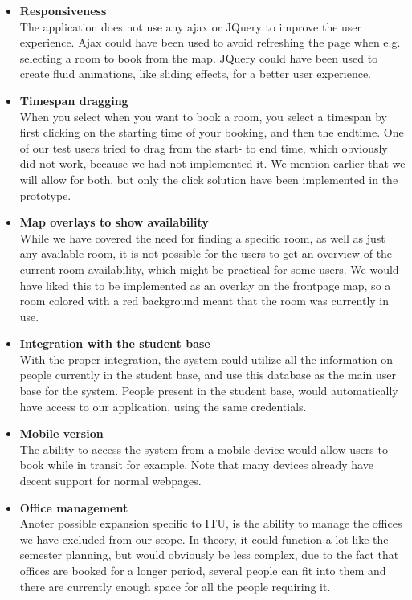 \begin{itemize}
	\item \textbf{Responsiveness}\\
	The application does not use any ajax or JQuery to improve the user experience. Ajax could have been used to avoid refreshing the page when e.g. selecting a room to book from the map. JQuery could have been used to create fluid animations, like sliding effects, for a better user experience. 
	
	\item \textbf{Timespan dragging}\\
	When you select when you want to book a room, you select a timespan by first clicking on the starting time of your booking, and then the endtime. One of our test users tried to drag from the start- to end time, which obviously did not work, because we had not implemented it. We mention earlier that we will allow for both, but only the click solution have been implemented in the prototype.
	
	\item \textbf{Map overlays to show availability}\\
	While we have covered the need for finding a specific room, as well as just any available room, it is not possible for the users to get an overview of the current room availability, which might be practical for some users. We would have liked this to be implemented as an overlay on the frontpage map, so a room colored with a red background meant that the room was currently in use.
	
	\item \textbf{Integration with the student base}\\
	With the proper integration, the system could utilize all the information on people currently in the student base, and use this database as the main user base for the system. People present in the student base, would automatically have access to our application, using the same credentials. 
	
	\item \textbf{Mobile version}\\
	The ability to access the system from a mobile device would allow users to book while in transit for example. Note that many devices already have decent support for normal webpages.
	
	\item \textbf{Office management}\\
	Anoter possible expansion specific to ITU, is the ability to manage the offices we have excluded from our scope. In theory, it could function a lot like the semester planning, but would obviously be less complex, due to the fact that offices are booked for a longer period, several people can fit into them and there are currently enough space for all the people requiring it.
\end{itemize}

